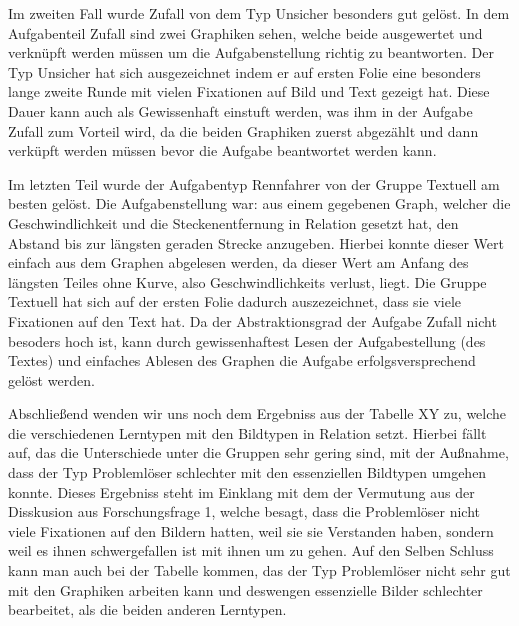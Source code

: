 Im zweiten Fall wurde Zufall von dem Typ Unsicher besonders gut gelöst. In dem Aufgabenteil Zufall sind zwei Graphiken sehen, welche beide ausgewertet und verknüpft werden müssen um die Aufgabenstellung richtig zu beantworten. Der Typ Unsicher hat sich ausgezeichnet indem er auf ersten Folie eine besonders lange zweite Runde mit vielen Fixationen auf Bild und Text gezeigt hat. Diese Dauer kann auch als Gewissenhaft einstuft werden, was ihm in der Aufgabe Zufall zum Vorteil wird, da die beiden Graphiken zuerst abgezählt und dann verküpft werden müssen bevor die Aufgabe beantwortet werden kann. 

Im letzten Teil wurde der Aufgabentyp Rennfahrer von der Gruppe Textuell am besten gelöst. Die Aufgabenstellung war: aus einem gegebenen Graph, welcher die Geschwindlichkeit und die Steckenentfernung in Relation gesetzt hat, den Abstand bis zur längsten geraden Strecke anzugeben. Hierbei konnte dieser Wert einfach aus dem Graphen abgelesen werden, da dieser Wert am Anfang des längsten Teiles ohne Kurve, also Geschwindlichkeits verlust, liegt. Die Gruppe Textuell hat sich auf der ersten Folie dadurch auszezeichnet, dass sie viele Fixationen auf den Text hat. Da der Abstraktionsgrad der Aufgabe Zufall nicht besoders hoch ist, kann durch gewissenhaftest Lesen der Aufgabestellung (des Textes) und einfaches Ablesen des Graphen die Aufgabe erfolgsversprechend gelöst werden. 

Abschließend wenden wir uns noch dem Ergebniss aus der Tabelle XY zu, welche die verschiedenen Lerntypen mit den Bildtypen in Relation setzt. Hierbei fällt auf, das die Unterschiede unter die Gruppen sehr gering sind, mit der Außnahme, dass der Typ Problemlöser schlechter mit den essenziellen Bildtypen umgehen konnte. Dieses Ergebniss steht im Einklang mit dem der Vermutung aus der Disskusion aus Forschungsfrage 1, welche besagt, dass die Problemlöser nicht viele Fixationen auf den Bildern hatten, weil sie sie Verstanden haben, sondern weil es ihnen schwergefallen ist mit ihnen um zu gehen. Auf den Selben Schluss kann man auch bei der Tabelle kommen, das der Typ Problemlöser nicht sehr gut mit den Graphiken arbeiten kann und deswengen essenzielle Bilder schlechter bearbeitet, als die beiden anderen Lerntypen. 


